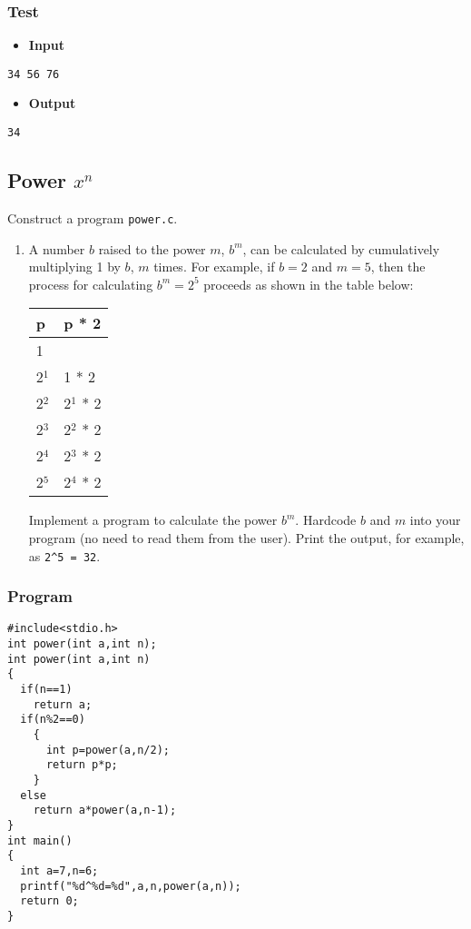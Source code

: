 \documentclass[11pt]{article}
\begin{document}
\subsubsection*{Test}
\label{sec-1-3-2}
\begin{itemize}
\item \textbf{Input}
\end{itemize}
\begin{verbatim}
34 56 76
\end{verbatim}

\begin{itemize}
\item \textbf{Output}
\end{itemize}

\begin{verbatim}
34
\end{verbatim}

\subsection*{Power $x^n$}
\label{sec-1-4}
Construct a program \texttt{power.c}.
\begin{enumerate}
\item A number $b$ raised to the power $m$, $b^m$, can be calculated
by cumulatively multiplying 1 by $b$, $m$ times. For example, if
$b = 2$ and $m = 5$, then the process for calculating $b^m =
      2^5$ proceeds as shown in the table below:
\begin{center}
\begin{tabular}{ll}
p & p * 2\\
\hline
1 & \\
2$^{\text{1}}$ & 1 * 2\\
2$^{\text{2}}$ & 2$^{\text{1}}$ * 2\\
2$^{\text{3}}$ & 2$^{\text{2}}$ * 2\\
2$^{\text{4}}$ & 2$^{\text{3}}$ * 2\\
2$^{\text{5}}$ & 2$^{\text{4}}$ * 2\\
\end{tabular}
\end{center}
Implement a program to calculate the power $b^m$. Hardcode $b$
and $m$ into your program (no need to read them from the
user). Print the output, for example, as \verb~2^5 = 32~.
\end{enumerate}
\subsubsection*{Program}
\label{sec-1-4-1}
\begin{verbatim}
#include<stdio.h>
int power(int a,int n);
int power(int a,int n)
{
  if(n==1)
    return a;
  if(n%2==0)
    {
      int p=power(a,n/2);
      return p*p;
    }
  else
    return a*power(a,n-1);
}
int main()
{
  int a=7,n=6;
  printf("%d^%d=%d",a,n,power(a,n));
  return 0;
}
\end{verbatim}
\end{document}
